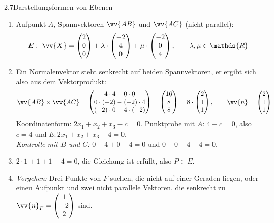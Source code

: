 \begin{loesung}{2.7}{Darstellungsformen von Ebenen}
\begin{enumerate}[label=\alph*)]
  \item Aufpunkt $A$, Spannvektoren $\vv{AB}$ und $\vv{AC}$ (nicht parallel):
  \[E:\ \vv{X} = \begin{pmatrix} 2\\ 0\\ 0\end{pmatrix}+\lambda\cdot\begin{pmatrix} -2\\ 4\\ 0\end{pmatrix}+\mu\cdot\begin{pmatrix} -2\\ 0\\ 4\end{pmatrix},\qquad\lambda,\mu\in\mathds{R}\]
  \item Ein Normalenvektor steht senkrecht auf beiden Spannvektoren, er ergibt sich also aus dem Vektorprodukt:
  \[\vv{AB}\times\vv{AC} = \begin{pmatrix} 4\cdot 4-0\cdot 0\\ 0\cdot(-2)-(-2)\cdot 4\\ (-2)\cdot 0-4\cdot(-2)\end{pmatrix} = \begin{pmatrix} 16\\ 8\\ 8\end{pmatrix} = 8\cdot\begin{pmatrix} 2\\ 1\\ 1\end{pmatrix},\qquad \vv{n} = \begin{pmatrix} 2\\ 1\\ 1\end{pmatrix}\]
  Koordinatenform: $2x_1+x_2+x_3-c = 0$. Punktprobe mit $A$: $4-c=0$, also $c=4$ und $E: 2x_1+x_2+x_3-4=0$.\\
  \textit{Kontrolle mit $B$ und $C$:} $0+4+0-4 = 0$ und $0+0+4-4 = 0$.
  \item $2\cdot 1+1+1-4 = 0$, die Gleichung ist erfüllt, also $P\in E$.
  \item \textit{Vorgehen:} Drei Punkte von $F$ suchen, die nicht auf einer Geraden liegen, oder einen Aufpunkt und zwei nicht parallele Vektoren, die senkrecht zu $\vv{n}_F = \begin{pmatrix} 1\\ -2\\ 2\end{pmatrix}$ sind.

\end{enumerate}
\end{loesung}
